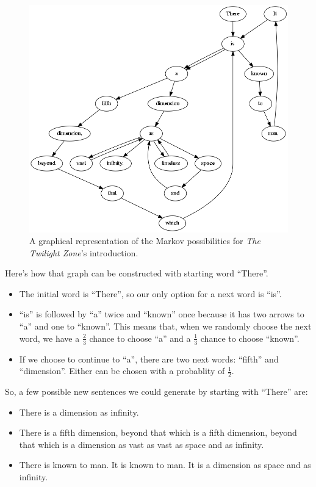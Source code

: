 \documentclass[11pt]{cselabheader}
\begin{document}
\begin{figure}[h]
  \centering
  \includegraphics[width=0.9\linewidth]{img/twilight_zone.png}
  \caption{A graphical representation of the Markov possibilities for \emph{The
    Twilight Zone}'s introduction.}
  \label{twilight}
\end{figure}

Here's how that graph can be constructed with starting word ``There''.
\begin{itemize}
  \item The initial word is ``There'', so our only option for a next word is
  ``is''.
  \item ``is'' is followed by ``a'' twice and ``known'' once because it has two
  arrows to ``a'' and one to ``known''. This means that, when we randomly
  choose the next word, we have a $\frac{2}{3}$ chance to choose ``a'' and a
  $\frac{1}{3}$ chance to choose ``known''.
  \item If we choose to continue to ``a'', there are two next words: ``fifth''
  and ``dimension''. Either can be chosen with a probablity of $\frac{1}{2}$.
\end{itemize}

So, a few possible new sentences we could generate by starting with ``There'' are:
\begin{itemize}
  \item There is a dimension as infinity.
  \item There is a fifth dimension, beyond that which is a fifth dimension,
    beyond that which is a dimension as vast as vast as space and as infinity.
  \item There is known to man. It is known to man. It is a dimension as space
    and as infinity.
\end{itemize}
\end{document}
